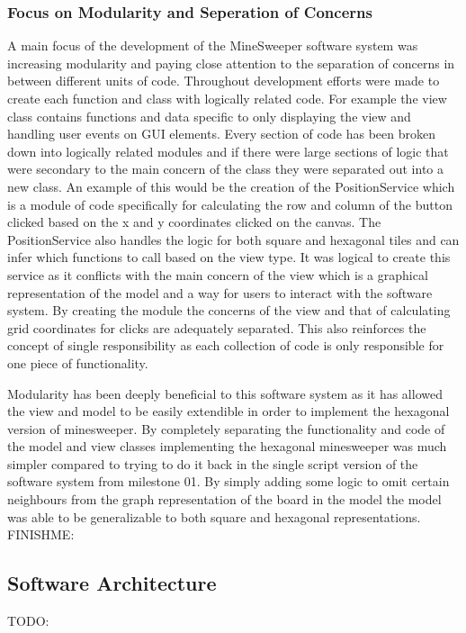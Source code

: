 \documentclass[12pt, a4]{report}
\begin{document}
\subsubsection{Focus on Modularity and Seperation of Concerns}
A main focus of the development of the MineSweeper software system was increasing modularity and paying close attention to the separation of concerns in between different units of code. Throughout development efforts were made to create each function and class with logically related code. For example the view class contains functions and data specific to only displaying the view and handling user events on GUI elements. Every section of code has been broken down into logically related modules and if there were large sections of logic that were secondary to the main concern of the class they were separated out into a new class. An example of this would be the creation of the PositionService which is a module of code specifically for calculating the row and column of the button clicked based on the x and y coordinates clicked on the canvas. The PositionService also handles the logic for both square and hexagonal tiles and can infer which functions to call based on the view type. It was logical to create this service as it conflicts with the main concern of the view which is a graphical representation of the model and a way for users to interact with the software system. By creating the module the concerns of the view and that of calculating grid coordinates for clicks are adequately separated. This also reinforces the concept of single responsibility as each collection of code is only responsible for one piece of functionality. 
\newline\par
Modularity has been deeply beneficial to this software system as it has allowed the view and model to be easily extendible in order to implement the hexagonal version of minesweeper. By completely separating the functionality and code of the model and view classes implementing the hexagonal minesweeper was much simpler compared to trying to do it back in the single script version of the software system from milestone 01. By simply adding some logic to omit certain neighbours from the graph representation of the board in the model the model was able to be generalizable to both square and hexagonal representations.
FINISHME:

\subsection{Software Architecture}
TODO:
\end{document}
